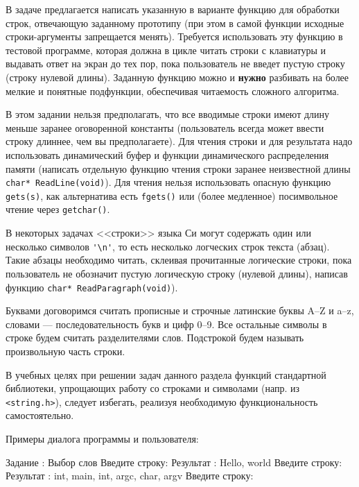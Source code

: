
В задаче предлагается написать указанную в варианте функцию для обработки строк,
отвечающую заданному прототипу (при этом в самой функции исходные строки-аргументы
запрещается менять). Требуется использовать эту функцию в тестовой программе,
которая должна в цикле читать строки с клавиатуры и выдавать ответ на экран до
тех пор, пока пользователь не введет пустую строку (строку нулевой длины). 
Заданную функцию можно и \textbf{нужно} разбивать на более мелкие и понятные
подфункции, обеспечивая читаемость сложного алгоритма.

В этом задании нельзя предполагать, что все вводимые строки имеют длину меньше
заранее оговоренной константы (пользователь всегда может ввести строку длиннее,
чем вы предполагаете). Для чтения строки и для результата надо использовать
динамический буфер и функции динамического распределения памяти (написать отдельную
функцию чтения строки заранее неизвестной длины \texttt{char* ReadLine(void)}).
Для чтения нельзя использовать опасную функцию \texttt{gets(s)},
как альтернатива есть \texttt{fgets()} или (более медленное) посимвольное чтение
через \texttt{getchar()}.

В некоторых задачах <<строки>> языка Си
могут содержать один или несколько символов \verb|'\n'|, то есть несколько
логческих строк текста (абзац). Такие абзацы необходимо читать, склеивая
прочитанные логические строки, пока пользователь не обозначит пустую логическую
строку (нулевой длины), написав функцию \texttt{char* ReadParagraph(void)}).

Буквами договоримся считать прописные и строчные латинские буквы 
A--Z и a--z, словами --- последовательность букв и цифр 0--9. Все остальные
символы в строке будем считать разделителями слов. Подстрокой будем называть
произвольную часть строки.

В учебных целях при решении задач данного раздела функций стандартной
библиотеки, упрощающих работу со строками и символами (напр. из 
\texttt{<string.h>}), следует избегать, реализуя необходимую
функциональность самостоятельно.

Примеры диалога программы и пользователя:

\begin{zzoutput}
  Задание : Выбор слов
  Введите строку: 
  Результат     : Hello, world
  Введите строку: 
  Результат     : int, main, int, argc, char, argv
  Введите строку: \zzuser{ }
\end{zzoutput}


